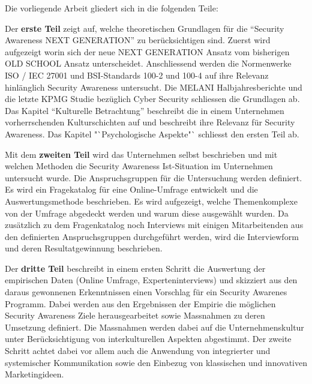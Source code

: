 \documentclass[../../main.tex]{subfiles}
\begin{document}
\begin{sloppypar}
Die vorliegende Arbeit gliedert sich in die folgenden Teile:


Der \textbf{erste Teil} zeigt auf, welche theoretischen Grundlagen für die "`Security Awareness NEXT GENERATION"' zu berücksichtigen sind. Zuerst wird aufgezeigt worin sich der neue NEXT GENERATION Ansatz vom bisherigen OLD SCHOOL Ansatz unterscheidet. Anschliessend werden die Normenwerke ISO / IEC 27001 und BSI-Standards 100-2 und 100-4 auf ihre Relevanz hinlänglich Security Awareness untersucht. Die MELANI Halbjahresberichte und die letzte KPMG Studie bezüglich Cyber Security schliessen die Grundlagen ab. Das Kapitel "`Kulturelle Betrachtung"' beschreibt die in einem Unternehmen vorherrschenden Kulturschichten auf und beschreibt ihre Relevanz für Security Awareness. Das Kapitel "`Psychologische Aspekte"` schliesst den ersten Teil ab.


Mit dem \textbf{zweiten Teil} wird das Unternehmen {\companyshort} selbst beschrieben und mit welchen Methoden die Security Awareness Ist-Situation im Unternehmen untersucht wurde. Die Anspruchsgruppen für die Untersuchung werden definiert. Es wird ein Fragekatalog für eine Online-Umfrage entwickelt und die Auswertungsmethode beschrieben. Es wird aufgezeigt, welche Themenkomplexe von der Umfrage abgedeckt werden und warum diese ausgewählt wurden. Da zusätzlich zu dem Fragenkatalog noch Interviews mit einigen Mitarbeitenden aus den definierten Anspruchsgruppen durchgeführt werden, wird die Interviewform und deren Resultatgewinnung beschrieben.


Der \textbf{dritte Teil} beschreibt in einem ersten Schritt die Auswertung der empirischen Daten (Online Umfrage, Experteninterviews) und skizziert aus den daraus gewonnenen Erkenntnissen einen Vorschlag für ein Security Awarenes Programm. Dabei werden aus den Ergebnissen der Empirie die möglichen Security Awareness Ziele herausgearbeitet sowie Massnahmen zu deren Umsetzung definiert. Die Massnahmen werden dabei auf die Unternehmenskultur unter Berücksichtigung von interkulturellen Aspekten abgestimmt. Der zweite Schritt achtet dabei vor allem auch die Anwendung von integrierter und systemischer Kommunikation sowie den Einbezug von klassischen und innovativen Marketingideen.


\end{sloppypar}
\end{document}
